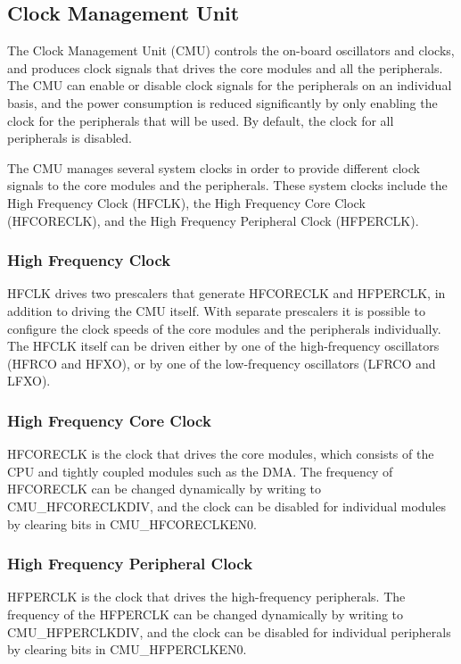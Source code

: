 \subsection{Clock Management Unit}\label{subsec:cmu}
The Clock Management Unit (CMU) controls the on-board oscillators and clocks, and produces clock signals that drives the core modules and all the peripherals. The CMU can enable or disable clock signals for the peripherals on an individual basis, and the power consumption is reduced significantly by only enabling the clock for the peripherals that will be used. By default, the clock for all peripherals is disabled. 

The CMU manages several system clocks in order to provide different clock signals to the core modules and the peripherals. These system clocks include the High Frequency Clock (HFCLK), the High Frequency Core Clock (HFCORECLK), and the High Frequency Peripheral Clock (HFPERCLK).\cite{efm32gg-rm}

\subsubsection{High Frequency Clock}
HFCLK drives two prescalers that generate HFCORECLK and HFPERCLK, in addition to driving the CMU itself. With separate prescalers it is possible to configure the clock speeds of the core modules and the peripherals individually. The HFCLK itself can be driven either by one of the high-frequency oscillators (HFRCO and HFXO), or by one of the low-frequency oscillators (LFRCO and LFXO). 

\subsubsection{High Frequency Core Clock}
HFCORECLK is the clock that drives the core modules, which consists of the CPU and tightly coupled modules such as the DMA. The frequency of HFCORECLK can be changed dynamically by writing to CMU\_HFCORECLKDIV, and the clock can be disabled for individual modules by clearing bits in CMU\_HFCORECLKEN0. 

\subsubsection{High Frequency Peripheral Clock}
HFPERCLK is the clock that drives the high-frequency peripherals. The frequency of the HFPERCLK can be changed dynamically by writing to CMU\_HFPERCLKDIV, and the clock can be disabled for individual peripherals by clearing bits in CMU\_HFPERCLKEN0. 


